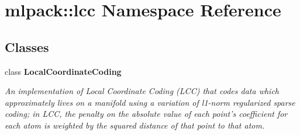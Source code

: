 \section{mlpack\-:\-:lcc Namespace Reference}
\label{namespacemlpack_1_1lcc}
\subsection*{Classes}
\begin{DoxyCompactItemize}
\item 
class {\bf Local\-Coordinate\-Coding}
\begin{DoxyCompactList}\small\item\em An implementation of Local Coordinate Coding (L\-C\-C) that codes data which approximately lives on a manifold using a variation of l1-\/norm regularized sparse coding; in L\-C\-C, the penalty on the absolute value of each point's coefficient for each atom is weighted by the squared distance of that point to that atom. \end{DoxyCompactList}\end{DoxyCompactItemize}

